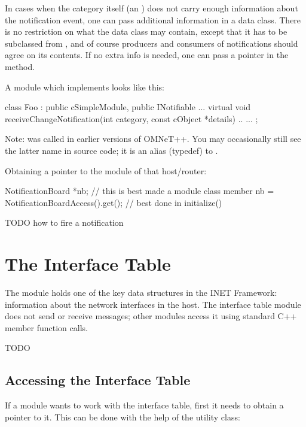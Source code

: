 In cases when the category itself (an ) does not carry enough
information about the notification event, one can pass additional
information in a data class. There is no restriction on what the data class
may contain, except that it has to be subclassed from ,
and of course producers and consumers of notifications should agree on its
contents. If no extra info is needed, one can pass a  pointer in
the  method.

A module which implements  looks like this:

\begin{cpp}
class Foo : public cSimpleModule, public INotifiable {
    ...
    virtual void receiveChangeNotification(int category, const cObject *details) {..}
    ...
};
\end{cpp}

Note:  was called  in earlier versions
of OMNeT++. You may occasionally still see the latter name in source code; it
is an alias (typedef) to .

Obtaining a pointer to the  module of that host/router:

\begin{cpp}
NotificationBoard *nb; // this is best made a module class member
nb = NotificationBoardAccess().get();  // best done in initialize()
\end{cpp}

TODO how to fire a notification
\fi


\section{The Interface Table}

The  module holds one of the key data structures in
the INET Framework: information about the network interfaces in the host.
The interface table module does not send or receive messages; other modules
access it using standard C++ member function calls.

\iffalse TODO
\subsection{Accessing the Interface Table}

If a module wants to work with the interface table, first it needs to obtain a
pointer to it. This can be done with the help of the
 utility class:

